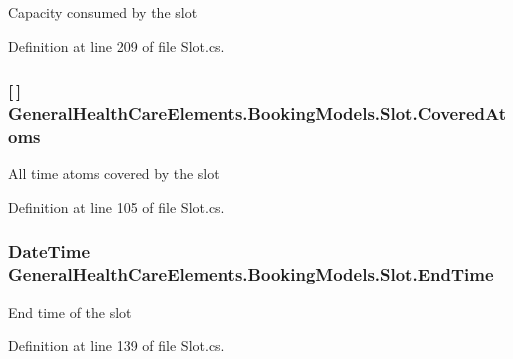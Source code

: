 Capacity consumed by the slot 



Definition at line 209 of file Slot.\+cs.

\subsubsection[{\texorpdfstring{Covered\+Atoms}{CoveredAtoms}}]{ \mbox{[}$\,$\mbox{]} General\+Health\+Care\+Elements.\+Booking\+Models.\+Slot.\+Covered\+Atoms\hspace{0.3cm}{\ttfamily [get]}}\hypertarget{class_general_health_care_elements_1_1_booking_models_1_1_slot_ad6d6f3281c164dd8feee7c25fceb9b42}{}\label{class_general_health_care_elements_1_1_booking_models_1_1_slot_ad6d6f3281c164dd8feee7c25fceb9b42}


All time atoms covered by the slot 



Definition at line 105 of file Slot.\+cs.

\subsubsection[{\texorpdfstring{End\+Time}{EndTime}}]{\setlength{\rightskip}{0pt plus 5cm}Date\+Time General\+Health\+Care\+Elements.\+Booking\+Models.\+Slot.\+End\+Time\hspace{0.3cm}{\ttfamily [get]}}\hypertarget{class_general_health_care_elements_1_1_booking_models_1_1_slot_a9d74c521934c63288b0d237caaf7ff94}{}\label{class_general_health_care_elements_1_1_booking_models_1_1_slot_a9d74c521934c63288b0d237caaf7ff94}


End time of the slot 



Definition at line 139 of file Slot.\+cs.


